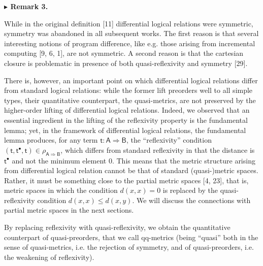  
 
\par\medskip\noindent\textbf{$\blacktriangleright$ Remark 3.}\par
 
 
While in the original definition [11] differential logical relations were symmetric, symmetry was abandoned in all subsequent works. The first reason is that several interesting notions of program difference, like e.g. those arising from incremental computing [9, 6, 1], are not symmetric. A second reason is that the cartesian closure is problematic in presence of both quasi-reflexivity and symmetry [29].\par
 
 
 
 
There is, however, an important point on which differential logical relations differ from standard logical relations: while the former lift preorders well to all simple types, their quantitative counterpart, the quasi-metrics, are not preserved by the higher-order lifting of differential logical relations. Indeed, we observed that an essential ingredient in the lifting of the reflexivity property is the fundamental lemma; yet, in the framework of differential logical relations, the fundamental lemma produces, for any term $\mathsf{t}:\mathsf{A}\Rightarrow\mathsf{B}$, the “reflexivity” condition $(\mathsf{t},{\mathsf{t}}^{\bullet},\mathsf{t})\in\rho_{\mathsf{A}\Rightarrow%
\mathsf{B}}$, which differs from standard reflexivity in that the distance is ${\mathsf{t}}^{\bullet}$ and not the minimum element $0$. This means that the metric structure arising from differential logical relation cannot be that of standard (quasi-)metric spaces. Rather, it must be something close to the partial metric spaces [4, 23], that is, metric spaces in which the condition $d(x,x)=0$ is replaced by the quasi-reflexivity condition $d(x,x)\leq d(x,y)$. We will discuss the connections with partial metric spaces in the next sections.\par
 
 
 
By replacing reflexivity with quasi-reflexivity, we obtain the quantitative counterpart of quasi-preorders, that we call qq-metrics (being “quasi” both in the sense of quasi-metrics, i.e. the rejection of symmetry, and of quasi-preorders, i.e. the weakening of reflexivity).\par
 
